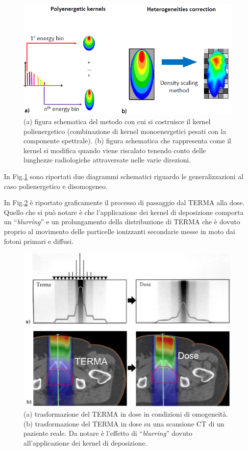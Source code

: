 {\begin{figure}
\centering
\includegraphics[width=\textwidth]{./cap1/kern_trans.png}
\caption{(a) figura schematica del metodo con cui si costruisce il kernel polienergetico (combinazione di kernel monoenergetici pesati con la componente spettrale). (b) figura schematica che rappresenta come il kernel si modifica quando viene riscalato tenendo conto delle lunghezze radiologiche attraversate nelle varie direzioni.}
\label{fig:kern_trans}
\end{figure}

In Fig.\ref{fig:kern_trans} sono riportati due diagrammi schematici riguardo le generalizzazioni al caso polienergetico e disomogeneo.


In Fig.\ref{fig:terma_dose} è riportato graficamente il processo di passaggio dal TERMA alla dose. Quello che si può notare è che l'applicazione dei kernel di deposizione comporta un \textquotedblleft\textit{blurring}\textquotedblright{} e un prolungamento della distribuzione di TERMA che è dovuto proprio al movimento delle particelle ionizzanti secondarie messe in moto dai fotoni primari e diffusi.
\begin{figure}
\centering
\includegraphics[width=.8\textwidth]{./cap1/terma_dose.png}
\caption{(a) trasformazione del TERMA in dose in condizioni di omogeneità. (b) trasformazione del TERMA in dose su una scansione CT di un paziente reale. Da notare è l'effetto di \textquotedblleft\textit{blurring}\textquotedblright{} dovuto all'applicazione dei kernel di deposizione.}
\label{fig:terma_dose}
\end{figure}



}
